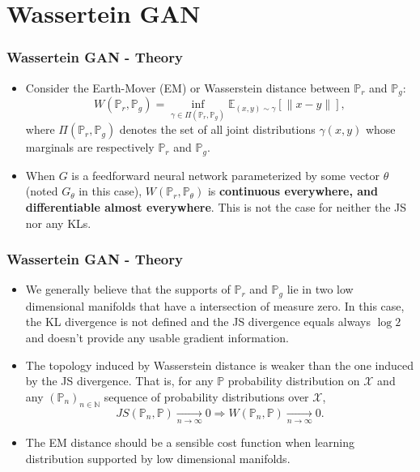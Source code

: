 \section{Wassertein GAN}

\begin{frame}
  \frametitle{Wassertein GAN - Theory}
  \begin{itemize}
    \item Consider the Earth-Mover (EM) or Wasserstein distance between
      $\mathbb{P}_r$ and $\mathbb{P}_g$:
      \[
        W(\mathbb{P}_r, \mathbb{P}_g)
        = \inf_{\gamma\in\Pi(\mathbb{P}_r, \mathbb{P}_g)}
        \mathbb{E}_{(x,y)\sim\gamma}[\|x-y\|],
      \]
      where $\Pi(\mathbb{P}_r, \mathbb{P}_g)$ denotes the set of all joint
      distributions $\gamma(x, y)$ whose marginals are respectively
      $\mathbb{P}_r$ and $\mathbb{P}_g$.
    \item When $G$ is a feedforward neural network parameterized by some
      vector $\theta$ (noted $G_{\theta}$ in this case),
      $W(\mathbb{P}_r, \mathbb{P}_{\theta})$ is \textbf{continuous everywhere,
      and differentiable almost everywhere}. This is not the case for neither
      the JS nor any KLs.
  \end{itemize}
\end{frame}

\begin{frame}
  \frametitle{Wassertein GAN - Theory}
  \begin{itemize}
    \item We generally believe that the supports of $\mathbb{P}_r$ and
      $\mathbb{P}_g$ lie in two low dimensional manifolds that have a
      intersection of measure zero. In this case, the KL divergence is
      not defined and the JS divergence equals always $\log2$ and doesn't
      provide any usable gradient information.
    \item The topology induced by Wasserstein distance is weaker than the one
      induced by the JS divergence. That is, for any $\mathbb{P}$
      probability distribution on $\mathcal{X}$ and any
      $(\mathbb{P}_n)_{n\in\mathbb{N}}$ sequence of probability distributions
      over $\mathcal{X}$,
      \[
        JS(\mathbb{P}_n, \mathbb{P})\xrightarrow[n\rightarrow\infty]{}0
        \Longrightarrow
        W(\mathbb{P}_n, \mathbb{P})\xrightarrow[n\rightarrow\infty]{}0.
      \]
    \item The EM distance should be a sensible cost function when learning
      distribution supported by low dimensional manifolds.
  \end{itemize}
\end{frame}

